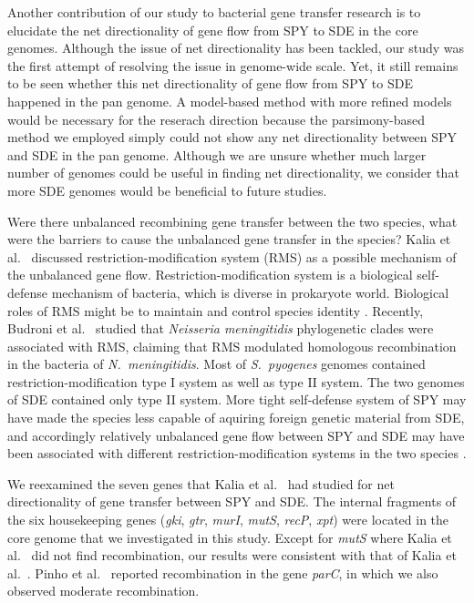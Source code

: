 \documentclass[10pt]{article}
\let\citep\cite
\let\citet\cite
\begin{document}
Another contribution of our study to bacterial gene transfer research is to
elucidate the net directionality of gene flow from SPY to SDE in the core
genomes. Although the issue of net directionality has been tackled, our study
was the first attempt of resolving the issue in genome-wide scale. Yet, it still
remains to be seen whether this net directionality of gene flow from SPY to SDE
happened in the pan genome. A model-based method with more refined models would
be necessary for the reserach direction because the parsimony-based method we
employed simply could not show any net directionality between SPY and SDE in the
pan genome. Although we are unsure whether much larger number of genomes could
be useful in finding net directionality, we consider that more SDE genomes would
be beneficial to future studies. 

Were there unbalanced recombining gene transfer between the two species, what
were the barriers \citep{Thomas2005} to cause the unbalanced gene transfer in
the species?  Kalia et al.\ \citet{Kalia2001} discussed restriction-modification system (RMS)
as a possible mechanism of the unbalanced gene flow.  Restriction-modification
system is a biological self-defense mechanism of bacteria, which is diverse in
prokaryote world.  Biological roles of RMS might be to maintain and control
species identity \citep{Jeltsch2003}.  Recently, Budroni et al.\ \citet{Budroni2011a} studied
that \textit{Neisseria meningitidis} phylogenetic clades were associated with
RMS, claiming that RMS modulated homologous recombination in the bacteria of
\textit{N.\ meningitidis}.  Most of \textit{S.\ pyogenes} genomes contained
restriction-modification type I system as well as type II system. The two
genomes of SDE contained only type II system. More tight self-defense system of
SPY may have made the species less capable of aquiring foreign genetic material
from SDE, and accordingly relatively unbalanced gene flow between SPY and SDE
may have been associated with different restriction-modification systems in the
two species \citep{Kalia2001}.

We reexamined the seven genes that Kalia et al.\ \citet{Kalia2001} had studied for net
directionality of gene transfer between SPY and SDE.  The internal fragments of
the six housekeeping genes (\textit{gki}, \textit{gtr}, \textit{murI},
\textit{mutS}, \textit{recP}, \textit{xpt}) were located in the core genome that
we investigated in this study.  Except for \textit{mutS} where Kalia et al.\ \citet{Kalia2001}
did not find recombination, our results were consistent with that of
Kalia et al.\ \citet{Kalia2001}.  Pinho et al.\ \citet{Pinho2010} reported recombination in the gene
\textit{parC}, in which we also observed moderate recombination.
\end{document}
